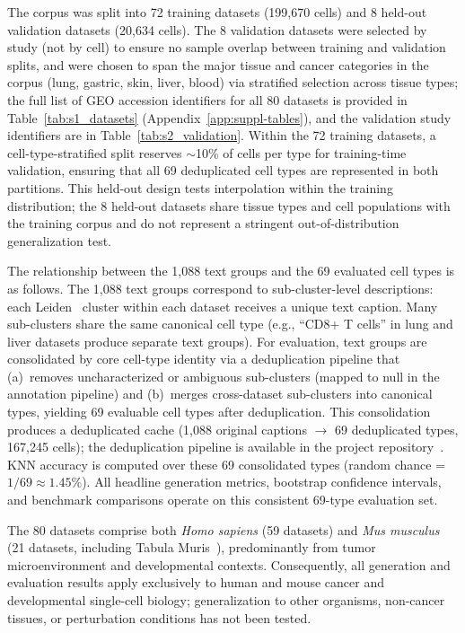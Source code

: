 \documentclass[genes,article,submit,pdftex,oneauthor]{Definitions/mdpi}
\begin{document}
The corpus was split into 72 training datasets (199,670 cells) and 8 held-out validation datasets (20,634 cells). The 8 validation datasets were selected by study (not by cell) to ensure no sample overlap between training and validation splits, and were chosen to span the major tissue and cancer categories in the corpus (lung, gastric, skin, liver, blood) via stratified selection across tissue types; the full list of GEO accession identifiers for all 80 datasets is provided in Table~\ref{tab:s1_datasets} (Appendix~\ref{app:suppl-tables}), and the validation study identifiers are in Table~\ref{tab:s2_validation}. Within the 72 training datasets, a cell-type-stratified split reserves $\sim$10\% of cells per type for training-time validation, ensuring that all 69 deduplicated cell types are represented in both partitions. This held-out design tests interpolation within the training distribution; the 8 held-out datasets share tissue types and cell populations with the training corpus and do not represent a stringent out-of-distribution generalization test.

The relationship between the 1,088 text groups and the 69 evaluated cell types is as follows. The 1,088 text groups correspond to sub-cluster-level descriptions: each Leiden~\cite{ref-leiden} cluster within each dataset receives a unique text caption. Many sub-clusters share the same canonical cell type (e.g., ``CD8+ T cells'' in lung and liver datasets produce separate text groups). For evaluation, text groups are consolidated by core cell-type identity via a deduplication pipeline that (a)~removes uncharacterized or ambiguous sub-clusters (mapped to null in the annotation pipeline) and (b)~merges cross-dataset sub-clusters into canonical types, yielding 69 evaluable cell types after deduplication. This consolidation produces a deduplicated cache (1,088 original captions $\to$ 69 deduplicated types, 167,245 cells); the deduplication pipeline is available in the project repository~\cite{ref-clop-dit}. KNN accuracy is computed over these 69 consolidated types (random chance = $1/69 \approx 1.45\%$). All headline generation metrics, bootstrap confidence intervals, and benchmark comparisons operate on this consistent 69-type evaluation set.

The 80 datasets comprise both \textit{Homo sapiens} (59 datasets) and \textit{Mus musculus} (21 datasets, including Tabula Muris~\cite{ref-tabula-muris}), predominantly from tumor microenvironment and developmental contexts. Consequently, all generation and evaluation results apply exclusively to human and mouse cancer and developmental single-cell biology; generalization to other organisms, non-cancer tissues, or perturbation conditions has not been tested.
\end{document}
